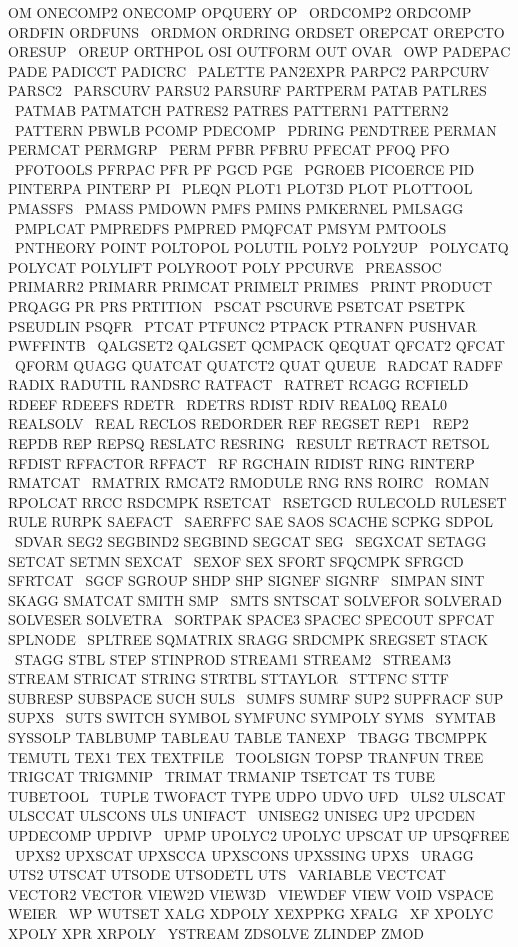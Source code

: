 \documentclass{article}
\begin{document}
     OM ONECOMP2 ONECOMP OPQUERY OP \
     ORDCOMP2 ORDCOMP ORDFIN ORDFUNS \
     ORDMON ORDRING ORDSET OREPCAT OREPCTO ORESUP \
     OREUP ORTHPOL OSI OUTFORM OUT OVAR \
     OWP PADEPAC PADE PADICCT PADICRC \
     PALETTE PAN2EXPR PARPC2 PARPCURV PARSC2 \
     PARSCURV PARSU2 PARSURF PARTPERM PATAB PATLRES \
     PATMAB PATMATCH PATRES2 PATRES PATTERN1 PATTERN2 \
     PATTERN PBWLB PCOMP PDECOMP \
     PDRING PENDTREE PERMAN PERMCAT PERMGRP \
     PERM PFBR PFBRU PFECAT PFOQ PFO \
     PFOTOOLS PFRPAC PFR PF PGCD PGE \
     PGROEB PICOERCE PID PINTERPA PINTERP PI \
     PLEQN PLOT1 PLOT3D PLOT PLOTTOOL PMASSFS \
     PMASS PMDOWN PMFS PMINS PMKERNEL PMLSAGG \
     PMPLCAT PMPREDFS PMPRED PMQFCAT PMSYM PMTOOLS \
     PNTHEORY POINT POLTOPOL POLUTIL POLY2 POLY2UP \
     POLYCATQ POLYCAT POLYLIFT POLYROOT POLY PPCURVE \
     PREASSOC PRIMARR2 PRIMARR PRIMCAT PRIMELT PRIMES \
     PRINT PRODUCT PRQAGG PR PRS PRTITION \
     PSCAT PSCURVE PSETCAT PSETPK PSEUDLIN PSQFR \
     PTCAT PTFUNC2 PTPACK PTRANFN PUSHVAR PWFFINTB \
     QALGSET2 QALGSET QCMPACK QEQUAT QFCAT2 QFCAT \
     QFORM QUAGG QUATCAT QUATCT2 QUAT QUEUE \
     RADCAT RADFF RADIX RADUTIL RANDSRC RATFACT \
     RATRET RCAGG RCFIELD RDEEF RDEEFS RDETR \
     RDETRS RDIST RDIV REAL0Q REAL0 REALSOLV \
     REAL RECLOS REDORDER REF REGSET REP1 \
     REP2 REPDB REP REPSQ RESLATC RESRING \
     RESULT RETRACT RETSOL RFDIST RFFACTOR RFFACT \
     RF RGCHAIN RIDIST RING RINTERP RMATCAT \
     RMATRIX RMCAT2 RMODULE RNG RNS ROIRC \
     ROMAN RPOLCAT RRCC RSDCMPK RSETCAT \
     RSETGCD RULECOLD RULESET RULE RURPK SAEFACT \
     SAERFFC SAE SAOS SCACHE SCPKG SDPOL \
     SDVAR SEG2 SEGBIND2 SEGBIND SEGCAT SEG \
     SEGXCAT SETAGG SETCAT SETMN SEXCAT \
     SEXOF SEX SFORT SFQCMPK SFRGCD SFRTCAT \
     SGCF SGROUP SHDP SHP SIGNEF SIGNRF \
     SIMPAN SINT SKAGG SMATCAT SMITH SMP \
     SMTS SNTSCAT SOLVEFOR SOLVERAD SOLVESER SOLVETRA \
     SORTPAK SPACE3 SPACEC SPECOUT SPFCAT SPLNODE \
     SPLTREE SQMATRIX SRAGG SRDCMPK SREGSET STACK \
     STAGG STBL STEP STINPROD STREAM1 STREAM2 \
     STREAM3 STREAM STRICAT STRING STRTBL STTAYLOR \
     STTFNC STTF SUBRESP SUBSPACE SUCH SULS \
     SUMFS SUMRF SUP2 SUPFRACF SUP SUPXS \
     SUTS SWITCH SYMBOL SYMFUNC SYMPOLY SYMS \
     SYMTAB SYSSOLP TABLBUMP TABLEAU TABLE TANEXP \
     TBAGG TBCMPPK TEMUTL TEX1 TEX TEXTFILE \
     TOOLSIGN TOPSP TRANFUN TREE TRIGCAT TRIGMNIP \
     TRIMAT TRMANIP TSETCAT TS TUBE TUBETOOL \
     TUPLE TWOFACT TYPE UDPO UDVO UFD \
     ULS2 ULSCAT ULSCCAT ULSCONS ULS UNIFACT \
     UNISEG2 UNISEG UP2 UPCDEN UPDECOMP UPDIVP \
     UPMP UPOLYC2 UPOLYC UPSCAT UP UPSQFREE \
     UPXS2 UPXSCAT UPXSCCA UPXSCONS UPXSSING UPXS \
     URAGG UTS2 UTSCAT UTSODE UTSODETL UTS \
     VARIABLE VECTCAT VECTOR2 VECTOR VIEW2D VIEW3D \
     VIEWDEF VIEW VOID VSPACE WEIER \
     WP WUTSET XALG XDPOLY XEXPPKG XFALG \
     XF XPOLYC XPOLY XPR XRPOLY \
     YSTREAM ZDSOLVE ZLINDEP ZMOD
\end{document}
